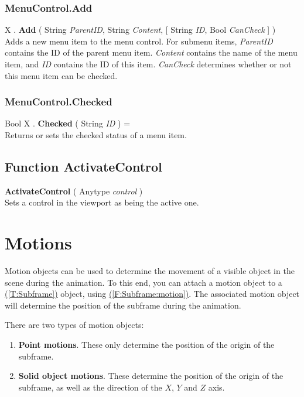 \documentclass[10pt]{book}
\newcommand{\linkitem}[1]{\hyperref[#1]{\nameref{#1} (\ref{#1})}}
\newcommand{\var}[1]{\textit{#1}}
\begin{document}
\subsubsection{MenuControl.Add \label{F:MenuControl:Add}}
X . \textbf{Add} ( String \textit{ParentID}, String \textit{Content},  [ String \textit{ID}, Bool \textit{CanCheck} ] ) \\
Adds a new menu item to the menu control. For submenu items, \var{ParentID} contains the ID of the parent menu item. \var{Content} contains the name of the menu item, and \var{ID} contains the ID of this item. \var{CanCheck} determines whether or not this menu item can be checked.

\subsubsection{MenuControl.Checked \label{F:MenuControl:Checked}}
Bool X . \textbf{Checked} ( String \textit{ID} ) = \\
Returns or sets the checked status of a menu item.

\subsection{Function ActivateControl \label{F:ActivateControl}}
\textbf{ActivateControl} ( Anytype \textit{control} ) \\
Sets a control in the viewport as being the active one.

\section{Motions \label{Motions}}
Motion objects can be used to determine the movement of a visible object in the scene during the animation. To this end, you can attach a motion object to a \linkitem{T:Subframe} object, using \linkitem{F:Subframe:motion}. The associated motion object will determine the position of the subframe during the animation.

There are two types of motion objects:
\begin{enumerate}
\item
\textbf{Point motions}.
These only determine the position of the origin of the subframe.
\item
\textbf{Solid object motions}.
These determine the position of the origin of the subframe, as well as the direction of the $X$, $Y$ and $Z$ axis.
\end{enumerate}
\end{document}
